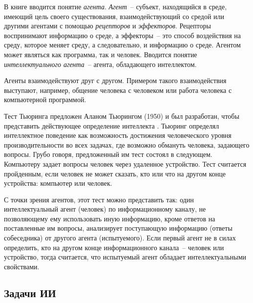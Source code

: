 \documentclass[a4paper,14pt, openany, twoside, final]{extbook} %
\begin{document}
В книге \cite{Russell} вводится понятие {\em агента}. {\em Агент}~-- субъект, находящийся в среде, имеющий цель своего существования, взаимодействующий со средой или другими агентами с помощью {\em рецепторов} и {\em эффекторов}. Рецепторы воспринимают информацию о среде, а эффекторы~-- это способ воздействия на среду, которое меняет среду, а следовательно, и информацию о среде. Агентом может являться как программа, так и человек. Вводится понятие {\em интеллектуального агента}~-- агента, обладающего интеллектом.

Агенты взаимодействуют друг с другом. Примером такого взаимодействия выступают, например, общение человека с человеком или работа человека с компьютерной программой.

Тест Тьюринга предложен Аланом Тьюрингом (1950) и был разработан, чтобы представить действующее определение интеллекта \cite{Russell}. Тьюринг определял интеллектное поведение как возможность достижения человеческого уровня производительности во всех задачах, где возможно обмануть человека, задающего вопросы. Грубо говоря, предложенный им тест состоял в следующем. Компьютеру задает вопросы человек через удаленное устройство. Тест считается пройденным, если человек не может сказать, кто или что на другом конце устройства: компьютер или человек.

С точки зрения агентов, этот тест можно представить так: один интеллектуальный агент (человек) по информационному каналу, не позволяющему ему использовать иную информацию, кроме ответов на поставленные им вопросы, анализирует поступающую информацию (ответы собеседника) от другого агента (испытуемого). Если первый агент не в силах определить, кто на другом конце информационного канала~-- человек или устройство, тогда считается, что испытуемый агент обладает интеллектуальными свойствами.

\subsection{Задачи ИИ}
\end{document}
